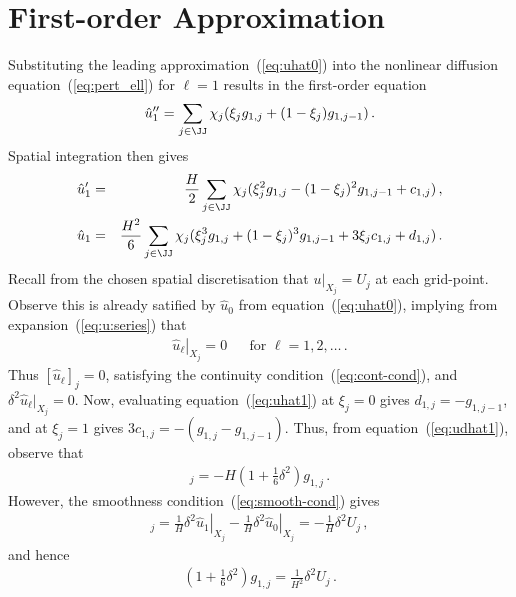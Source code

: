 \documentclass[12pt,a5paper]{article}
\begin{document}
\section{First-order Approximation}
Substituting the leading approximation~(\ref{eq:uhat0}) into the
nonlinear diffusion equation~(\ref{eq:pert_ell}) for $\ell=1$ results in
the first-order equation
\begin{eqnarray}
\hat{u}''_1 = \sum_{j\in\JJ}\chi_j(\xi_j g_{1,j}+(1-\xi_j)g_{1,j-1})\,.
\end{eqnarray}
Spatial integration then gives
\begin{eqnarray}
\hat{u}'_1 & = & \frac{H}{2}\sum_{j\in\JJ}\chi_j(\xi^2_j g_{1,j}
-(1-\xi_j)^2g_{1,j-1}+c_{1,j})\,,
\label{eq:udhat1}
\\
\hat{u}_1 & = & \frac{H^2}{6}\sum_{j\in\JJ}\chi_j(\xi^3_j g_{1,j}
+(1-\xi_j)^3g_{1,j-1}+3\xi_{j}c_{1,j}+d_{1,j})\,.
\label{eq:uhat1}
\end{eqnarray}
Recall from the chosen  spatial discretisation that $u|_{X_j}=U_{j}$ at each grid-point.
Observe this is already satified by $\hat{u}_0$ from equation~(\ref{eq:uhat0}), implying
from expansion~(\ref{eq:u:series}) that
\begin{eqnarray}
\left.\hat{u}_\ell\right|_{X_j}=0 && \mbox{for }\ell=1,2,\ldots\,.
\end{eqnarray}
Thus $[\hat{u}_\ell]_j=0$, satisfying the continuity 
condition~(\ref{eq:cont-cond}), and $\delta^2\hat{u}_\ell|_{X_j}=0$.
Now, evaluating equation~(\ref{eq:uhat1}) at $\xi_j=0$ gives $d_{1,j}=-g_{1,j-1}$,
and at $\xi_j=1$ gives $3c_{1,j}=-(g_{1,j}-g_{1,j-1})$.
Thus,  from equation~(\ref{eq:udhat1}), observe that
\begin{eqnarray}
[\hat{u}'_1]_j = -H(1+\frac{1}{6}\delta^2)g_{1,j}\,.
\end{eqnarray}
However, the smoothness condition~(\ref{eq:smooth-cond}) gives
\begin{eqnarray}
   [\hat{u}'_1]_j = 
\frac{1}{H}\left.\delta^{2}\hat{u}_1\right|_{X_j}
-\frac{1}{H}\left.\delta^{2}\hat{u}_0\right|_{X_j}
= -\frac{1}{H}\delta^{2}U_j\,,
\end{eqnarray}
and hence
\begin{eqnarray}
(1+\frac{1}{6}\delta^2)g_{1,j} = \frac{1}{H^2}\delta^2U_j\,.
\end{eqnarray}

\end{document}
